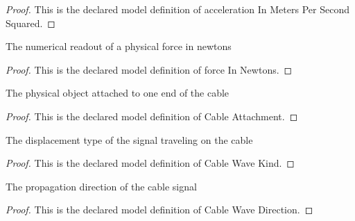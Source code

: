 \begin{proof}
  This is the declared model definition of acceleration In Meters Per Second Squared.
\end{proof}
\begin{definition}
  \label{def:physics:phyx-mini-0167:phyxminiproblems-problemphyxmini0167-forceinnewtons}
  The numerical readout of a physical force in newtons
\end{definition}
\begin{proof}
  This is the declared model definition of force In Newtons.
\end{proof}
\begin{definition}
  \label{def:physics:phyx-mini-0167:phyxminiproblems-problemphyxmini0167-cableattachment}
  The physical object attached to one end of the cable
\end{definition}
\begin{proof}
  This is the declared model definition of Cable Attachment.
\end{proof}
\begin{definition}
  \label{def:physics:phyx-mini-0167:phyxminiproblems-problemphyxmini0167-cablewavekind}
  The displacement type of the signal traveling on the cable
\end{definition}
\begin{proof}
  This is the declared model definition of Cable Wave Kind.
\end{proof}
\begin{definition}
  \label{def:physics:phyx-mini-0167:phyxminiproblems-problemphyxmini0167-cablewavedirection}
  The propagation direction of the cable signal
\end{definition}
\begin{proof}
  This is the declared model definition of Cable Wave Direction.
\end{proof}
